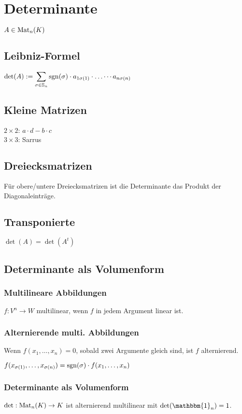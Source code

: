 \section*{Determinante}
$A\in\operatorname{Mat}_n(K)$

\subsection*{Leibniz-Formel}
$\displaystyle \det(A) := \sum_{\sigma\in\mathbb{S}_n} \operatorname{sgn}(\sigma)\cdot a_{1\sigma(1)}\cdot\dots\cdots a_{n\sigma(n)}$

\subsection*{Kleine Matrizen}
$2\times2$: $a\cdot d - b\cdot c$ \\
$3\times3$: Sarrus

\subsection*{Dreiecksmatrizen}
Für obere/untere Dreiecksmatrizen ist die Determinante
das Produkt der Diagonaleinträge.

\subsection*{Transponierte}
$\det(A) = \det(A^t)$

\subsection*{Determinante als Volumenform}

\subsubsection*{Multilineare Abbildungen}
$f:V^n\to W$ multilinear, wenn
$f$ in jedem Argument linear ist.

\subsubsection*{Alternierende multi. Abbildungen}
Wenn $f(x_1,\dots,x_n)=0$, sobald zwei Argumente gleich sind,
ist $f$ alternierend.

$f(x_{\sigma(1)},\dots,x_{\sigma(n)}) = \operatorname{sgn}(\sigma)\cdot f(x_1,\dots,x_n)$

\subsubsection*{Determinante als Volumenform}
$\det : \operatorname{Mat}_n(K)\to K$ ist alternierend multilinear
mit $\det(\mathbbm{1}_n)=1$.

